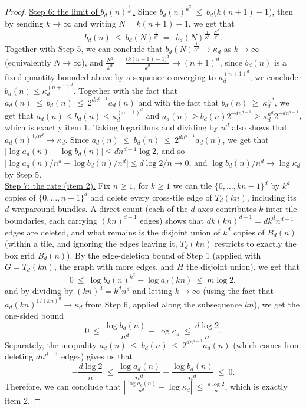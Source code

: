 \documentclass[10pt,a4paper]{amsart}
\begin{document}
\begin{proof}
\underline{Step 6: the limit of $b_d(n)^{\frac{1}{n^d}}$.} Since $b_d(n)^{k^d}\ \le\ b_d\big(k(n+1)-1\big)$, then by sending $k \to \infty$ and writing $N=k(n+1)-1$, we get that
\[
b_d(n)\ \le\ b_d(N)^{\frac{1}{k^d}}\ =\ \Big[b_d(N)^{\frac{1}{N^d}}\Big]^{\frac{N^d}{k^d}}.
\]
Together with Step 5, we can conclude that $b_d(N)^{\frac{1}{N^d}}\to\kappa_d$ as $k\to\infty$ (equivalently $N\to\infty$), and $\frac{N^d}{k^d}=\frac{\big(k(n+1)-1\big)^d}{k^d}\to(n+1)^d$, since $b_d(n)$ is a fixed quantity bounded above by a sequence converging to $\kappa_d^{(n+1)^d}$, we conclude $b_d(n)\le\kappa_d^{(n+1)^d}$. Together with the fact that $a_d(n)\ \le\ b_d(n)\ \le\ 2^{dn^{d-1}}a_d(n)$ and with the fact that $b_d(n)\ \ge\ \kappa_d^{\,n^d}$, we get that $a_d(n)\le b_d(n)\le\kappa_d^{(n+1)^d}$ and $a_d(n)\ge b_d(n)2^{-dn^{d-1}}\ge\kappa_d^{n^d}2^{-dn^{d-1}}$, which is exactly item 1. Taking logarithms and dividing by $n^d$ also shows that $a_d(n)^{1/n^d}\to\kappa_d$. Since $a_d(n)\ \le\ b_d(n)\ \le\ 2^{dn^{d-1}}a_d(n)$, we get that $|\log a_d(n)-\log b_d(n)|\le dn^{d-1}\log2$, and so $\big|\log a_d(n)/n^d-\log b_d(n)/n^d\big|\le d\log2/n\to0$, and $\log b_d(n)/n^d\to\log\kappa_d$ by Step 5.\\

\underline{Step 7: the rate (item 2).} Fix $n\ge1$, for $k\ge1$ we can tile $\{0,\dots,kn-1\}^d$ by $k^d$ copies of $\{0,\dots,n-1\}^d$ and delete every cross-tile edge of $T_d(kn)$, including its $d$ wraparound bundles. A direct count (each of the $d$ axes contributes $k$ inter-tile boundaries, each carrying $(kn)^{d-1}$ edges) shows that $dk(kn)^{d-1}=dk^dn^{d-1}$ edges are deleted, and what remains is the disjoint union of $k^d$ copies of $B_d(n)$ (within a tile, and ignoring the edges leaving it, $T_d(kn)$ restricts to exactly the box grid $B_d(n)$). By the edge-deletion bound of Step 1 (applied with $G=T_d(kn)$, the graph with more edges, and $H$ the disjoint union), we get that
\[
0\ \le\ \log b_d(n)^{k^d}-\log a_d(kn)\ \le\ m\log2,
\]
and by dividing by $(kn)^d=k^dn^d$ and letting $k\to\infty$ (using the fact that $a_d(kn)^{1/(kn)^d}\to\kappa_d$ from Step 6, applied along the subsequence $kn$), we get the one-sided bound
\begin{equation*}
0\ \le\ \frac{\log b_d(n)}{n^d}-\log\kappa_d\ \le\ \frac{d\log2}n.
\end{equation*}
Separately, the inequality $a_d(n)\ \le\ b_d(n)\ \le\ 2^{dn^{d-1}}a_d(n)$ (which comes from deleting $dn^{d-1}$ edges) gives us that
\begin{equation*}
-\frac{d\log2}n\ \le\ \frac{\log a_d(n)}{n^d}-\frac{\log b_d(n)}{n^d}\ \le\ 0.
\end{equation*}
Therefore, we can conclude that $\left|\frac{\log a_d(n)}{n^d}-\log\kappa_d\right|\ \le\ \frac{d\log2}n$, which is exactly item 2.
\end{proof}
\end{document}
